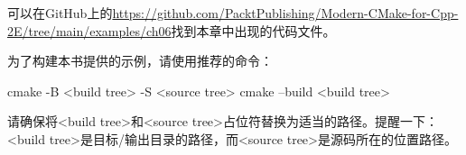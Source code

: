 
可以在GitHub上的\url{https://github.com/PacktPublishing/Modern-CMake-for-Cpp-2E/tree/main/examples/ch06}找到本章中出现的代码文件。

为了构建本书提供的示例，请使用推荐的命令：

\begin{shell}
cmake -B <build tree> -S <source tree>
cmake --build <build tree>
\end{shell}

请确保将<build tree>和<source tree>占位符替换为适当的路径。提醒一下：<build tree>是目标/输出目录的路径，而<source tree>是源码所在的位置路径。
